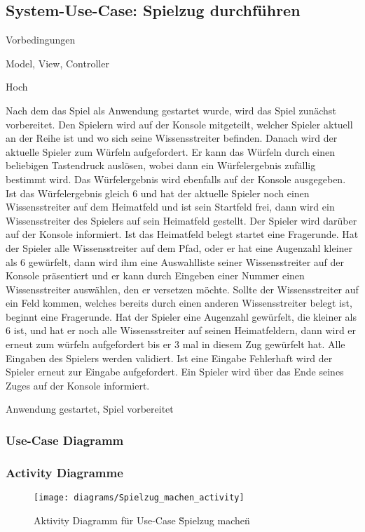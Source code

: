 \subsection{System-Use-Case: Spielzug durchführen}
\begin{labeling}[:]{Vorbedingungen}
\item [Akteure] Model, View, Controller
\item [Priorität] Hoch
\item [Beschreibung] Nach dem das Spiel als Anwendung gestartet wurde, wird das Spiel zunächst vorbereitet. Den Spielern wird auf der Konsole mitgeteilt, welcher Spieler aktuell an der Reihe ist und wo sich seine Wissensstreiter befinden. Danach wird der aktuelle Spieler zum Würfeln aufgefordert. Er kann das Würfeln durch einen beliebigen Tastendruck auslösen, wobei dann ein Würfelergebnis zufällig bestimmt wird. Das Würfelergebnis wird ebenfalls auf der Konsole ausgegeben.
Ist das Würfelergebnis gleich 6 und hat der aktuelle Spieler noch einen Wissensstreiter auf dem Heimatfeld und  ist sein Startfeld frei, dann wird ein Wissensstreiter des Spielers auf sein Heimatfeld gestellt. Der Spieler wird darüber auf der Konsole informiert. Ist das Heimatfeld belegt startet eine Fragerunde.
Hat der Spieler alle Wissensstreiter auf dem Pfad, oder er hat eine Augenzahl kleiner als 6 gewürfelt, dann wird ihm eine Auswahlliste seiner Wissensstreiter auf der Konsole präsentiert und er kann durch Eingeben einer Nummer einen Wissensstreiter auswählen, den er versetzen möchte. Sollte der Wissensstreiter auf ein Feld kommen, welches bereits durch einen anderen Wissensstreiter belegt ist, beginnt eine Fragerunde.
Hat der Spieler eine Augenzahl gewürfelt, die kleiner als 6 ist, und hat er noch alle Wissensstreiter auf seinen Heimatfeldern, dann wird er erneut zum würfeln aufgefordert bis er 3 mal in diesem Zug gewürfelt hat.
Alle Eingaben des Spielers werden validiert. Ist eine Eingabe Fehlerhaft wird der Spieler erneut zur Eingabe aufgefordert.
Ein Spieler wird über das Ende seines Zuges auf der Konsole informiert.
\item [Vorbedingungen] Anwendung gestartet, Spiel vorbereitet
\item [Offene Punkte]
\end{labeling}

\subsubsection{Use-Case Diagramm}

\subsubsection{Activity Diagramme}
\begin{figure}[h]
  \begin{center}
    \texttt{[image: diagrams/Spielzug\_machen\_activity]}
    \caption{Aktivity Diagramm für Use-Case \"Spielzug machen\"}
  \end{center}
\end{figure}

